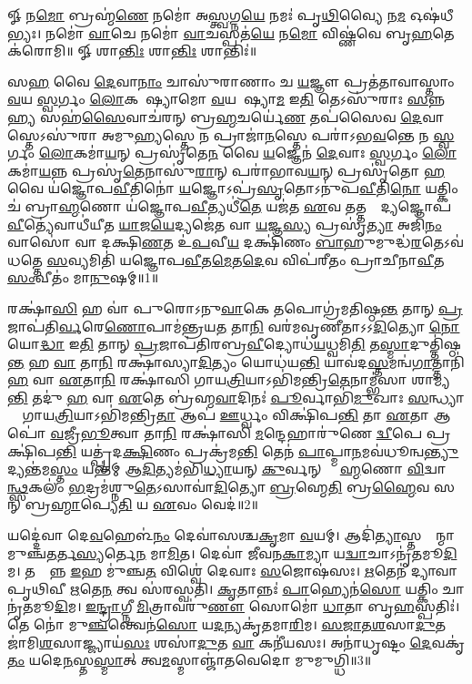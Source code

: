 
\setcounter{anuvakam}{0}
𑍐 𑌨\ul{𑌮𑍋} 𑌬𑍍𑌰𑌹𑍍𑌮॑\ul{𑌣𑍇} 𑌨𑌮𑍋॑ 𑌅\ul{𑌸𑍍𑌤𑍍𑌵}𑌗𑍍𑌨\ul{𑌯𑍇} 𑌨𑌮𑌃॑ 𑌪𑍃\ul{𑌥𑌿}𑌵𑍍𑌯𑍈 𑌨\ul{𑌮} 𑌓𑌷॑𑌧𑍀𑌭𑍍𑌯𑌃। 
𑌨𑌮𑍋॑ \ul{𑌵𑌾}𑌚𑍇 𑌨𑌮𑍋॑ \ul{𑌵𑌾}𑌚𑌸𑍍𑌪𑌤॑\ul{𑌯𑍇} 𑌨\ul{𑌮𑍋} 𑌵𑌿𑌷𑍍𑌣॑𑌵𑍇 𑌬𑍃\ul{𑌹}𑌤𑍇 𑌕॑𑌰𑍋𑌮𑌿॥
𑍐 𑌶𑌾\ul{𑌨𑍍𑌤𑌿𑌃} 𑌶𑌾\ul{𑌨𑍍𑌤𑌿𑌃} 𑌶𑌾𑌨𑍍𑌤𑌿𑌃॑॥

𑌸\ul{𑌹} 𑌵𑍈 \ul{𑌦𑍇}𑌵𑌾\ul{𑌨𑌾𑌂} 𑌚𑌾𑌸𑍁॑𑌰𑌾𑌣𑌾𑌂 𑌚 \ul{𑌯}𑌜𑍍𑌞𑍗 𑌪𑍍𑌰𑌤॑𑌤𑌾𑌵𑌾𑌸𑍍𑌤𑌾𑌂 \ul{𑌵}𑌯 \ul{𑌸𑍍𑌵}𑌰𑍍𑌗𑌂 \ul{𑌲𑍋}𑌕𑌮𑍇᳚𑌷𑍍𑌯𑌾𑌮𑍋 \ul{𑌵}𑌯𑌮𑍇᳚𑌷𑍍𑌯𑌾\ul{𑌮} 𑌇\ul{𑌤𑌿} 𑌤𑍇𑌽𑌸𑍁॑𑌰𑌾𑌃 \ul{𑌸}𑌨𑍍𑌨\ul{𑌹𑍍𑌯} 𑌸𑌹॑\ul{𑌸𑍈}𑌵𑌾𑌚॑𑌰𑌨𑍍 𑌬𑍍𑌰\ul{𑌹𑍍𑌮}𑌚𑌰𑍍𑌯𑍇॑\ul{𑌣} 𑌤𑌪॑𑌸𑍈𑌵 \ul{𑌦𑍇}𑌵𑌾𑌸𑍍𑌤𑍇𑌽𑌸𑍁॑𑌰𑌾 𑌅𑌮𑍁\ul{𑌹𑍍𑌯}\ul{}𑌸𑍍𑌤𑍇 𑌨 𑌪𑍍𑌰𑌾𑌜𑌾॑\ul{𑌨}\ul{}𑌸𑍍𑌤𑍇 𑌪𑌰𑌾॑𑌽𑌭\ul{𑌵}𑌨𑍍𑌤𑍇 𑌨 \ul{𑌸𑍍𑌵}𑌰𑍍𑌗𑌂 \ul{𑌲𑍋}𑌕𑌮𑌾॑\ul{𑌯}𑌨𑍍 𑌪𑍍𑌰𑌸𑍃॑𑌤𑍇\ul{𑌨} 𑌵𑍈 \ul{𑌯}𑌜𑍍𑌞𑍇𑌨॑ \ul{𑌦𑍇}𑌵𑌾𑌃 \ul{𑌸𑍍𑌵}𑌰𑍍𑌗𑌂 \ul{𑌲𑍋}𑌕𑌮𑌾॑\ul{𑌯}𑌨𑍍𑌨 𑌪𑍍𑌰𑌸𑍃॑\ul{𑌤𑍇}𑌨𑌾𑌸𑍁॑\ul{𑌰𑌾}𑌨𑍍 𑌪𑌰𑌾॑𑌭𑌾𑌵\ul{𑌯}𑌨𑍍 𑌪𑍍𑌰𑌸𑍃॑𑌤𑍋 \ul{𑌹} 𑌵𑍈 𑌯॑𑌜𑍍𑌞𑍋𑌪\ul{𑌵𑍀}𑌤𑌿𑌨𑍋॑ \ul{𑌯}𑌜𑍍𑌞𑍋𑌽𑌪𑍍𑌰॑\ul{𑌸𑍃}𑌤𑍋𑌽𑌨𑍁॑𑌪\ul{𑌵𑍀}𑌤𑌿\ul{𑌨𑍋} 𑌯𑌤𑍍𑌕𑌿𑌂 𑌚॑ 𑌬𑍍𑌰𑌾\ul{𑌹𑍍𑌮}𑌣𑍋 𑌯॑𑌜𑍍𑌞𑍋𑌪\ul{𑌵𑍀}𑌤𑍍𑌯𑌧𑍀॑\ul{𑌤𑍇} 𑌯𑌜॑𑌤 \ul{𑌏}𑌵 𑌤𑌤𑍍𑌤𑌸𑍍𑌮𑌾᳚𑌦𑍍𑌯𑌜𑍍𑌞𑍋𑌪\ul{𑌵𑍀}𑌤𑍍𑌯𑍇॑𑌵𑌾𑌧𑍀॑𑌯𑍀𑌤 \ul{𑌯𑌾}𑌜\ul{𑌯𑍇}𑌦𑍍𑌯𑌜𑍇॑𑌤 𑌵𑌾 \ul{𑌯}𑌜𑍍𑌞\ul{𑌸𑍍𑌯} 𑌪𑍍𑌰𑌸𑍃॑\ul{𑌤𑍍𑌯𑌾} 𑌅𑌜𑌿॑\ul{𑌨𑌂} 𑌵𑌾𑌸𑍋॑ 𑌵𑌾 𑌦𑌕𑍍𑌷𑌿\ul{𑌣}𑌤 𑌉॑\ul{𑌪}𑌵𑍀\ul{𑌯} 𑌦𑌕𑍍𑌷𑌿॑𑌣𑌂 \ul{𑌬𑌾}𑌹𑍁𑌮𑍁𑌦𑍍𑌧॑\ul{𑌰}𑌤𑍇𑌽𑌵॑ 𑌧𑌤𑍍𑌤𑍇 \ul{𑌸}𑌵𑍍𑌯𑌮𑌿𑌤𑌿॑ 𑌯𑌜𑍍𑌞𑍋𑌪\ul{𑌵𑍀}𑌤\ul{𑌮𑍇}𑌤\ul{𑌦𑍇}𑌵 𑌵𑌿𑌪॑𑌰𑍀𑌤𑌂 𑌪𑍍𑌰𑌾𑌚𑍀𑌨𑌾\ul{𑌵𑍀}𑌤 \ul{𑌸𑌂}𑌵𑍀𑌤𑌂॑ 𑌮𑌾\ul{𑌨𑍁}𑌷𑌮𑍍॥1॥\anuvakamend

𑌰𑌕𑍍𑌷𑌾॑\ul{𑌸𑌿} 𑌹 𑌵𑌾॑ 𑌪𑍁𑌰𑍋𑌽𑌨𑍁\ul{𑌵𑌾}𑌕𑍇 𑌤𑌪𑍋𑌗𑍍𑌰॑𑌮𑌤𑌿𑌷𑍍𑌠\ul{𑌨𑍍𑌤} 𑌤𑌾𑌨𑍍 \ul{𑌪𑍍𑌰}𑌜𑌾𑌪॑𑌤𑌿\ul{𑌰𑍍𑌵}𑌰𑍇\ul{𑌣𑍋}𑌪𑌾\-𑌮॑𑌨𑍍𑌤𑍍𑌰𑌯\ul{𑌤} 𑌤𑌾\ul{𑌨𑌿} 𑌵𑌰॑𑌮𑌵𑍃𑌣𑍀𑌤𑌾𑌽𑌽\ul{𑌦𑌿}𑌤𑍍𑌯𑍋 \ul{𑌨𑍋} 𑌯𑍋\ul{𑌦𑍍𑌧𑌾} 𑌇\ul{𑌤𑌿} 𑌤𑌾𑌨𑍍 \ul{𑌪𑍍𑌰}𑌜𑌾𑌪॑𑌤𑌿𑌰𑌬𑍍𑌰\ul{𑌵𑍀}𑌦𑍍𑌯𑍋𑌧॑\ul{𑌯}𑌧𑍍𑌵𑌮𑌿\ul{𑌤𑌿} 𑌤\ul{𑌸𑍍𑌮𑌾}𑌦𑍁𑌤𑍍𑌤𑌿॑𑌷𑍍𑌠\ul{𑌨𑍍𑌤}\ul{} 𑌹 \ul{𑌵𑌾} 𑌤𑌾\ul{𑌨𑌿} 𑌰𑌕𑍍𑌷𑌾॑𑌸𑍍𑌯𑌾\ul{𑌦𑌿}𑌤𑍍𑌯𑌂 𑌯𑍋𑌧॑𑌯\ul{𑌨𑍍𑌤𑌿} 𑌯𑌾𑌵॑𑌦\ul{𑌸𑍍𑌤}𑌮𑌨𑍍𑌵॑\ul{𑌗𑌾}𑌤𑍍𑌤𑌾𑌨𑌿॑ \ul{𑌹} 𑌵𑌾 \ul{𑌏}𑌤𑌾\ul{𑌨𑌿} 𑌰𑌕𑍍𑌷𑌾॑𑌸𑌿 𑌗𑌾𑌯\ul{𑌤𑍍𑌰𑌿}𑌯𑌾\-𑌽𑌭𑌿॑𑌮𑌨𑍍𑌤𑍍𑌰𑌿\ul{𑌤𑍇}𑌨𑌾𑌮𑍍𑌭॑𑌸𑌾 𑌶𑌾𑌮𑍍𑌯\ul{𑌨𑍍𑌤𑌿} 𑌤𑌦𑍁॑ \ul{𑌹} 𑌵𑌾 \ul{𑌏}𑌤𑍇 𑌬𑍍𑌰॑𑌹𑍍𑌮\ul{𑌵𑌾}𑌦𑌿𑌨𑌃॑ \ul{𑌪𑍂}𑌰𑍍𑌵𑌾𑌭𑌿॑\ul{𑌮𑍁}𑌖𑌾𑌃 \ul{𑌸}𑌨𑍍𑌧𑍍𑌯𑌾𑌯𑌾𑌂᳚ 𑌗𑌾𑌯\ul{𑌤𑍍𑌰𑌿}𑌯𑌾\-𑌽𑌭𑌿॑𑌮𑌨𑍍𑌤𑍍𑌰𑌿\ul{𑌤𑌾} 𑌆𑌪॑ \ul{𑌊}𑌰𑍍𑌧𑍍𑌵𑌂 𑌵𑌿𑌕𑍍𑌷𑌿॑𑌪\ul{𑌨𑍍𑌤𑌿} 𑌤𑌾 \ul{𑌏}𑌤𑌾 𑌆𑌪𑍋॑ \ul{𑌵}𑌜𑍍𑌰𑍀\ul{𑌭𑍂}𑌤𑍍𑌵𑌾 𑌤𑌾\ul{𑌨𑌿} 𑌰𑌕𑍍𑌷𑌾॑𑌸𑌿 \ul{𑌮}𑌨𑍍𑌦𑍇𑌹𑌾𑌰𑍁॑𑌣𑍇 \ul{𑌦𑍍𑌵𑍀}𑌪𑍇 𑌪𑍍𑌰𑌕𑍍𑌷𑌿॑𑌪\ul{𑌨𑍍𑌤𑌿} 𑌯𑌤𑍍𑌪𑍍𑌰॑𑌦\ul{𑌕𑍍𑌷𑌿}𑌣𑌂 𑌪𑍍𑌰𑌕𑍍𑌰॑𑌮\ul{𑌨𑍍𑌤𑌿} 𑌤𑍇𑌨॑ \ul{𑌪𑌾}𑌪𑍍𑌮𑌾\ul{𑌨}𑌮𑌵॑𑌧𑍂𑌨𑍍𑌵\ul{𑌨𑍍𑌤𑍍𑌯𑍁}𑌦𑍍𑌯𑌨𑍍𑌤॑𑌮\ul{𑌸𑍍𑌤𑌂} 𑌯𑌨𑍍𑌤॑𑌮𑍍 𑌆\ul{𑌦𑌿}𑌤𑍍𑌯𑌮॑𑌭𑌿\ul{𑌧𑍍𑌯𑌾}𑌯𑌨𑍍 \ul{𑌕𑍁}𑌰𑍍𑌵𑌨𑍍 𑌬𑍍𑌰𑌾᳚\ul{𑌹𑍍𑌮}𑌣𑍋 \ul{𑌵𑌿}𑌦𑍍𑌵𑌾\ul{𑌨𑍍𑌥𑍍𑌸}𑌕𑌲𑌂॑ \ul{𑌭}𑌦𑍍𑌰𑌮॑𑌶𑍍𑌨𑍁\ul{𑌤𑍇}𑌽𑌸𑌾𑌵𑌾॑\ul{𑌦𑌿}𑌤𑍍𑌯𑍋 \ul{𑌬𑍍𑌰}𑌹𑍍𑌮𑍇\ul{𑌤𑌿} 𑌬𑍍𑌰\ul{𑌹𑍍𑌮𑍈}𑌵 𑌸𑌨𑍍 𑌬𑍍𑌰\ul{𑌹𑍍𑌮𑌾}𑌪𑍍𑌯𑍇\ul{𑌤𑌿} 𑌯 \ul{𑌏}𑌵𑌂 𑌵𑍇𑌦॑॥2॥\anuvakamend

𑌯𑌦𑍍𑌦𑍇॑𑌵𑌾 𑌦𑍇\ul{𑌵}𑌹𑍇𑌳॑\ul{𑌨𑌂} 𑌦𑍇𑌵𑌾॑𑌸𑌶𑍍𑌚\ul{𑌕𑍃}𑌮𑌾 \ul{𑌵}𑌯𑌮𑍍। 
𑌆𑌦𑌿॑\ul{𑌤𑍍𑌯𑌾}𑌸𑍍𑌤𑌸𑍍𑌮𑌾᳚𑌨𑍍𑌮𑌾 𑌮𑍁𑌞𑍍𑌚\ul{𑌤}𑌰𑍍𑌤\ul{𑌸𑍍𑌯}𑌰𑍍𑌤𑍇\ul{𑌨} 𑌮𑌾\ul{𑌮𑌿}𑌤। 
𑌦𑍇𑌵𑌾॑ 𑌜𑍀𑌵𑌨\ul{𑌕𑌾}𑌮𑍍𑌯𑌾 𑌯\ul{𑌦𑍍𑌵𑌾}𑌚𑌾𑌽𑌨𑍃॑𑌤\-𑌮𑍂\ul{𑌦𑌿}𑌮। 
𑌤𑌸𑍍𑌮𑌾᳚𑌨𑍍𑌨 \ul{𑌇}𑌹 𑌮𑍁॑𑌞𑍍𑌚\ul{𑌤} 𑌵𑌿𑌶𑍍𑌵𑍇॑ 𑌦𑍇𑌵𑌾𑌃 \ul{𑌸}𑌜𑍋𑌷॑𑌸𑌃। 
\ul{𑌋}𑌤𑍇𑌨॑ 𑌦𑍍𑌯𑌾𑌵𑌾𑌪𑍃𑌥𑌿𑌵𑍀 \ul{𑌋}𑌤𑍇\ul{𑌨} 𑌤𑍍𑌵 𑌸॑𑌰𑌸𑍍𑌵𑌤𑌿। 
\ul{𑌕𑍃}𑌤𑌾𑌨𑍍𑌨𑌃॑ \ul{𑌪𑌾}𑌹𑍍𑌯𑍇𑌨॑\ul{𑌸𑍋} 𑌯𑌤𑍍𑌕𑌿𑌂 𑌚𑌾𑌨𑍃॑𑌤\-𑌮𑍂\ul{𑌦𑌿}𑌮। 
\ul{𑌇}\ul{𑌨𑍍𑌦𑍍𑌰𑌾}𑌗𑍍𑌨𑍀 \ul{𑌮𑌿}𑌤𑍍𑌰𑌾𑌵𑌰𑍁॑\ul{𑌣𑍗} 𑌸𑍋𑌮𑍋॑ \ul{𑌧𑌾}𑌤𑌾 𑌬𑍃\ul{𑌹}𑌸𑍍𑌪𑌤𑌿𑌃॑। 
𑌤𑍇 𑌨𑍋॑ 𑌮𑍁\ul{𑌞𑍍𑌚}𑌨𑍍𑌤𑍍𑌵𑍇𑌨॑\ul{𑌸𑍋} 𑌯\ul{𑌦}𑌨𑍍𑌯𑌕𑍃॑𑌤𑌮𑌾\ul{𑌰𑌿}𑌮। 
\ul{𑌸}\ul{𑌜𑌾}\ul{𑌤}\ul{𑌶}\ul{}𑌸𑌾\ul{𑌦𑍁}𑌤 𑌜𑌾॑𑌮𑌿\ul{𑌶}\ul{}𑌸𑌾𑌜𑍍𑌜𑍍𑌯𑌾𑌯॑\ul{𑌸𑌃} 𑌶𑌸𑌾॑\ul{𑌦𑍁}𑌤 \ul{𑌵𑌾} 𑌕𑌨𑍀॑𑌯𑌸𑌃। 
𑌅𑌨𑌾॑𑌧𑍃𑌷𑍍𑌟𑌂 \ul{𑌦𑍇}𑌵𑌕𑍃॑\ul{𑌤𑌂} 𑌯𑌦𑍇\ul{𑌨}𑌸𑍍𑌤\ul{𑌸𑍍𑌮𑌾}𑌤𑍍 𑌤𑍍𑌵\ul{𑌮}𑌸𑍍𑌮𑌾𑌞𑍍𑌜𑌾॑𑌤𑌵𑍇𑌦𑍋 𑌮𑍁𑌮𑍁𑌗𑍍𑌧𑌿॥3॥

